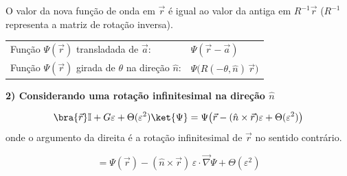 \begin{center}
\end{center}

O valor da nova função de onda em $\vec{r}$ é igual ao valor da antiga em $R^{-1}\vec{r}$ ($R^{-1}$ representa a matriz de rotação inversa).

\begin{center}
\begin{tabular}{ll}
Função $\Psi(\vec{r})$ transladada de $\vec{a}$: & $\Psi(\vec{r}-\vec{a})$ \\
Função $\Psi(\vec{r})$ girada de $\theta$ na direção $\hat{n}$: & $\Psi\big(R(-\theta,\hat{n})\,\vec{r}\big)$
\end{tabular}
\end{center}

\textbf{2) Considerando uma rotação infinitesimal na direção $\hat{n}$}

\begin{equation}
    \bra{\vec{r}} \mathbb{I} + G\varepsilon + \Theta(\varepsilon^2) \ket{\Psi} = \Psi\big(\vec{r} - (\hat{n}\times\vec{r})\varepsilon + \Theta(\varepsilon^2)\big)
\label{eq:aula21_U_infinitesimal}
\end{equation}
onde o argumento da direita é a rotação infinitesimal de $\vec{r}$ no sentido contrário.

\begin{equation}
    = \Psi(\vec{r}) - (\hat{n}\times\vec{r})\,\varepsilon\cdot\vec{\nabla}\Psi + \Theta(\varepsilon^2)
\label{eq:aula21_U_infinitesimal_expandido}
\end{equation}

